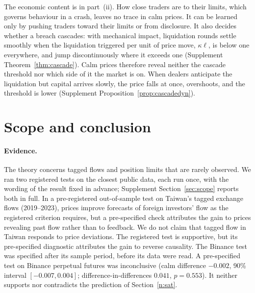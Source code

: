 \documentclass[12pt]{article}
\theoremstyle{definition}
\theoremstyle{remark}
\begin{document}
The economic content is in part~(ii). How close traders are to their limits, which governs behaviour in a crash, leaves no trace in calm prices. It can be learned only by pushing traders toward their limits or from disclosure. It also decides whether a breach cascades: with mechanical impact, liquidation rounds settle smoothly when the liquidation triggered per unit of price move, $\kappa\ell$, is below one everywhere, and jump discontinuously where it exceeds one (Supplement Theorem~\ref{thm:cascade}). Calm prices therefore reveal neither the cascade threshold nor which side of it the market is on. When dealers anticipate the liquidation but capital arrives slowly, the price falls at once, overshoots, and the threshold is lower (Supplement Proposition~\ref{prop:cascadedyn}).

\section{Scope and conclusion}\label{n:concl}

\paragraph{Evidence.} The theory concerns tagged flows and position limits that are rarely observed. We ran two registered tests on the closest public data, each run once, with the wording of the result fixed in advance; Supplement Section~\ref{sec:scope} reports both in full. In a pre-registered out-of-sample test on Taiwan's tagged exchange flows (2019--2023), prices improve forecasts of foreign investors' flow as the registered criterion requires, but a pre-specified check attributes the gain to prices revealing past flow rather than to feedback. We do not claim that tagged flow in Taiwan responds to price deviations. The registered test is supportive, but its pre-specified diagnostic attributes the gain to reverse causality. The Binance test was specified after its sample period, before its data were read. A pre-specified test on Binance perpetual futures was inconclusive (calm difference $-0.002$, 90\% interval $[-0.007, 0.004]$; difference-in-differences $0.041$, $p=0.553$). It neither supports nor contradicts the prediction of Section~\ref{n:sat}.
\end{document}
